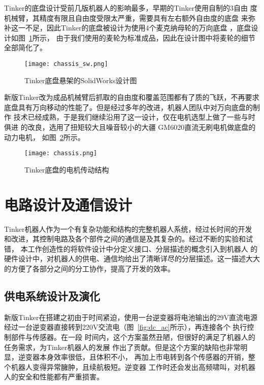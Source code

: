Tinker的底盘设计受前几版机器人的影响最多，早期的Tinker使用自制的3自由
度机械臂，其精度有限且自由度受限太严重，需要具有左右额外自由度的底盘
来弥补这一不足，因此Tinker的底盘被设计为使用4个麦克纳母轮的万向底盘
\cite{tlale2008kinematics}，底盘设计如图~\ref{fig:chassis_sw}所示，
由于我们使用的麦轮为标准成品，因此在设计图中将麦轮的细节全部简化了。

\begin{figure}[ht] %
  \centering
  \texttt{[image: chassis\_sw.png]}
  \caption{Tinker底盘悬架的SolidWorks设计图}
  \label{fig:chassis_sw}
\end{figure}

新版Tinker改为成品机械臂后抓取的自由度和覆盖范围都有了质的飞跃，不再要求
底盘具有万向移动的性能了。但是经过多年的改进，机器人团队中对万向底盘的制作
技术已经成熟，于是我们继续沿用了这一设计，仅在电机选型上做了一些与时俱进
的改良，选用了扭矩较大且噪音较小的大疆 GM6020直流无刷电机做底盘的动力电机，
如图~\ref{fig:chassis}所示。

\begin{figure}[ht] %
  \centering
  \texttt{[image: chassis.png]}
  \caption{Tinker底盘的电机传动结构}
  \label{fig:chassis}
\end{figure}


\section{电路设计及通信设计}

Tinker机器人作为一个有复杂功能和结构的完整机器人系统，经过长时间的开发
和改进，其控制电路及各个部件之间的通信是及其复杂的。经过不断的实验和试错，
本工作创造性的将软件设计中分定义接口、分层描述的概念引入到机器人
的硬件设计中，对机器人的供电、通信均给出了清晰详尽的分层描述。这一描述大大
的方便了各部分之间的分工协作，提高了开发的效率。

\subsection{供电系统设计及演化}

新版Tinker在搭建之初由于时间紧迫，使用一台逆变器将电池输出的29V直流电源
经过一台逆变器直接转到220V交流电（图~\ref{fig:dc_ac}所示），再连接各个
执行控制部件与传感器。在一段
时间内，这个方案虽然丑陋，但很好的满足了机器人的任务需求，为Tinker机器人的发展
作出了贡献。但是这个方案的缺陷也非常明显，逆变器本身效率很低，且体积不小，
再加上市电转到各个传感器的开销，整个机器人变得异常臃肿，且续航极短。逆变器
工作时还会发出高频啸叫，对机器人的安全和性能都有严重损害。

